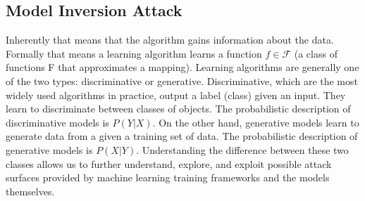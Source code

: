 \subsection{Model Inversion Attack}
Inherently that means that the algorithm gains information about the data. Formally that means a learning algorithm learns a function $f\in \mathcal{F}$ (a class of functions F that approximates a mapping). Learning algorithms are generally one of the two types: discriminative  or generative. Discriminative, which are the most widely used algorithms in practice, output a label (class) given an input. They learn to discriminate between classes of objects. The probabilistic description of discriminative models is $P(Y\vert X)$. On the other hand, generative models learn to generate data from  a given a training set of data. The probabilistic description of generative models is $P(X\vert Y)$. Understanding the difference between these two classes allows us to further understand, explore, and exploit possible attack surfaces provided by machine learning training frameworks and the models themselves.

